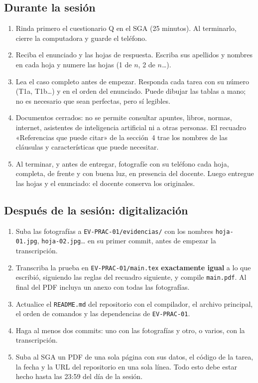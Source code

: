 \documentclass[11pt]{article}
\newcommand{\subseccion}[1]{\subsection{\textcolor{midblue}{#1}}}
\begin{document}
\subseccion{Durante la sesión}

\begin{enumerate}[leftmargin=18pt,itemsep=2pt]
	\item Rinda primero el cuestionario Q en el SGA (25 minutos). Al terminarlo, cierre la computadora y guarde el teléfono.
	\item Reciba el enunciado y las hojas de respuesta. Escriba sus apellidos y nombres en cada hoja y numere las hojas (1 de $n$, 2 de $n$\ldots).
	\item Lea el caso completo antes de empezar. Responda cada tarea con su número (T1a, T1b\ldots) y en el orden del enunciado. Puede dibujar las tablas a mano; no es necesario que sean perfectas, pero sí legibles.
	\item Documentos cerrados: no se permite consultar apuntes, libros, normas, internet, asistentes de inteligencia artificial ni a otras personas. El recuadro «Referencias que puede citar» de la sección~4 trae los nombres de las cláusulas y características que puede necesitar.
	\item Al terminar, y antes de entregar, fotografíe con su teléfono cada hoja, completa, de frente y con buena luz, en presencia del docente. Luego entregue las hojas y el enunciado: el docente conserva los originales.
\end{enumerate}

\subseccion{Después de la sesión: digitalización}

\begin{enumerate}[leftmargin=18pt,itemsep=2pt]
	\item Suba las fotografías a \texttt{EV-PRAC-01/evidencias/} con los nombres \texttt{hoja-01.jpg}, \texttt{hoja-02.jpg}\ldots{} en su primer commit, antes de empezar la transcripción.
	\item Transcriba la prueba en \texttt{EV-PRAC-01/main.tex} \textbf{exactamente igual} a lo que escribió, siguiendo las reglas del recuadro siguiente, y compile \texttt{main.pdf}. Al final del PDF incluya un anexo con todas las fotografías.
	\item Actualice el \texttt{README.md} del repositorio con el compilador, el archivo principal, el orden de comandos y las dependencias de \texttt{EV-PRAC-01}.
	\item Haga al menos dos commits: uno con las fotografías y otro, o varios, con la transcripción.
	\item Suba al SGA un PDF de una sola página con sus datos, el código de la tarea, la fecha y la URL del repositorio en una sola línea. Todo esto debe estar hecho hasta las 23:59 del día de la sesión.
\end{enumerate}
\end{document}
